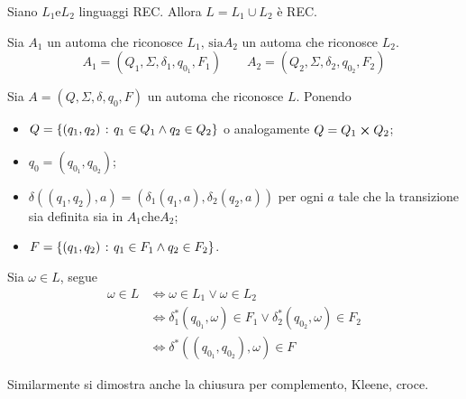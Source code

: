 \documentclass{subfiles}
\begin{document}
\begin{Theorem}
    Siano \(L_{1} \text{e} L_{2}\) linguaggi REC. Allora \(L = L_{1} \cup L_{2}\) è REC.

    \begin{Proof*}
        Sia \(A_{1}\) un automa che riconosce \(L_{1} \text{, sia} A_{2}\) un automa che riconosce \(L_{2}\).
        \[
            A_{1} = (Q_{1}, \Sigma, \delta_{1}, q_{0_{1}}, F_{1}) \qquad A_{2} = (Q_{2}, \Sigma, \delta_{2}, q_{0_{2}}, F_{2})
        \]

        \noindent Sia \(A = (Q, \Sigma, \delta, q_{0}, F)\) un automa che riconosce \(L\). Ponendo
        \begin{itemize}
            \item \(Q = \left\{(q_{1}, q_{2}) \operatorname{\: {:} \:} q_{1} \in Q_{1} \land q_{2} \in Q_{2}\right\}\) o analogamente \(Q = Q_{1} \cp Q_{2}\);
            \item \(q_{0} = (q_{0_{1}}, q_{0_{2}})\);
            \item \(\delta((q_{1}, q_{2}), a) = (\delta_{1}(q_{1}, a), \delta_{2}(q_{2}, a))\) per ogni \(a\) tale che la transizione sia definita sia in \(A_{1} \text{che} A_{2}\);
            \item \(F = \left\{(q_{1}, q_{2}) \operatorname{\: {:} \:} q_{1} \in F_{1} \land q_{2} \in F_{2}\right\}\).
        \end{itemize}

        \noindent Sia \(\omega \in L\), segue
        \[\begin{aligned}
                \omega \in L & \iff \omega \in L_{1} \lor \omega \in L_{2}                                                       \\
                             & \iff \delta_{1}^{*}(q_{0_{1}}, \omega) \in F_{1} \lor \delta_{2}^{*}(q_{0_{2}}, \omega) \in F_{2} \\
                             & \iff \delta^{*}((q_{0_{1}}, q_{0_{2}}), \omega) \in F
            \end{aligned}\]
    \end{Proof*}
\end{Theorem}

\begin{Note*}
    Similarmente si dimostra anche la chiusura per complemento, Kleene, croce.
\end{Note*}

\clearpage
\end{document}
